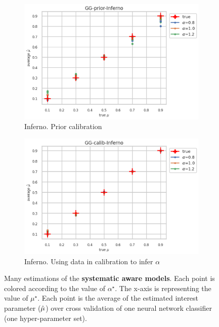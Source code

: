 \begin{figure}[ht!]
  \begin{subfigure}[t]{0.49\linewidth}
    \includegraphics[width=\linewidth]{COMPARE/GG-prior/Inferno/profusion_true_mu_target_mean.png}
    \caption{Inferno. Prior calibration}
  \end{subfigure}%
  \hfill
  \begin{subfigure}[t]{0.49\linewidth}
    \includegraphics[width=\linewidth]{COMPARE/GG-calib/Inferno/profusion_true_mu_target_mean.png}
    \caption{Inferno. Using data in calibration to infer $\alpha$}
  \end{subfigure}

  \caption{Many estimations of the \textbf{systematic aware models}. Each point is colored according to the value of $\alpha^\star$. The x-axis is representing the value of $\mu^\star$. Each point is the average of the estimated interest parameter ($\hat\mu$) over cross validation of one neural network classifier (one hyper-parameter set).}
  \label{fig:gg_syst_aware_compare_calib_estimator}
\end{figure}

